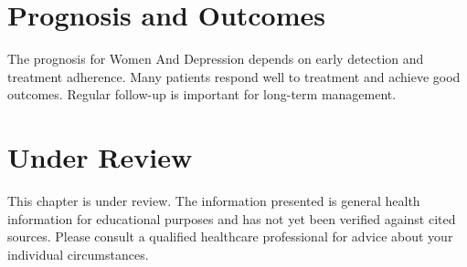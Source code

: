 \section*{Prognosis and Outcomes}
The prognosis for Women And Depression depends on early detection and treatment adherence. Many patients respond well to treatment and achieve good outcomes. Regular follow-up is important for long-term management.
\section*{Under Review}
This chapter is under review. The information presented is general health information for educational purposes and has not yet been verified against cited sources. Please consult a qualified healthcare professional for advice about your individual circumstances.


\clearpage
